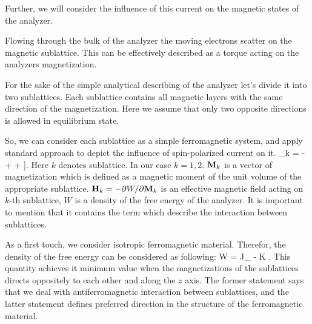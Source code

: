 Further, we will consider the influence of this current on the magnetic states of the analyzer.

Flowing through the bulk of the analyzer the moving electrons scatter on the magnetic sublattice. This can be effectively described as a torque acting on the analyzers magnetization.

For the sake of the simple analytical describing of the analyzer let's divide it into two sublattices. Each sublattice contains all magnetic layers with the same direction of the magnetization. Here we assume that only two opposite directions is allowed in equilibrium state.

So, we can consider each sublattice as a simple ferromagnetic system, and apply standard approach to depict the influence of spin-polarized current on it.
\be
	\label{ eq:LLGS }
	_k =
			- \gamma {}
			+ 
			+ 
				\left[
					\mb{M}_k \times \left[ \mb{M}_k \times \uv{p}_k \right]
				\right].
\ee
Here $k$ denotes sublattice. In our case $k = 1, 2$. $\mathbf{ {M} }_k$ is a vector of magnetization which is defined as a magnetic moment of the unit volume of the appropriate sublattice. $\mathbf{ {H} }_k = -\partial W / \partial \mathbf{ {M} }_k$ is an effective magnetic field acting on $k$-th sublattice, $W$ is a density of the free energy of the analyzer. It is important to mention that it contains the term which describe the interaction between sublattices.

As a first touch, we consider isotropic ferromagnetic material. Therefor, the density of the free energy can be considered as following:
\be
	\label{ eq:free_enegy }
	W = J_ 
		-  K .
\ee
This quantity achieves it minimum value when the magnetizations of the sublattices directs oppositely to each other and along the $z$ axis. The former statement says that we deal with antiferromagnetic interaction between sublattices, and the latter statement defines preferred direction in the structure of the ferromagnetic material.















